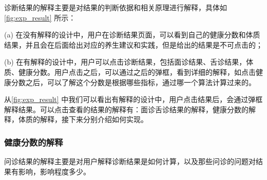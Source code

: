 诊断结果的解释主要是对结果的判断依据和相关原理进行解释，具体如 \ref{fig:exp_result} 所示：

(a) 在没有解释的设计中，用户在诊断结果页面，可以看到自己的健康分数和体质结果，并且会在后面给出对应的养生建议和实践，但是给出的结果是不可点击的；

(b) 在有解释的设计中，用户可以点击诊断结果，包括面诊结果、舌诊结果，体质、健康分数。用户点击之后，可以通过之后的弹框，看到详细的解释，如点击健康分数之后，可以了解这个分数是根据哪些指标，通过哪一个算法计算过来的。

从\ref{fig:exp_result} 中我们可以看出有解释的设计中，用户点击结果后，会通过弹框解释结果。可以点击查看的结果的解释有：面诊舌诊结果的解释，健康分数的解释，体质的解释，接下来分别介绍如何实现。



\subsubsection{健康分数的解释}
问诊结果的解释主要是对用户解释诊断结果是如何计算，以及那些问诊的问题对结果有影响，影响程度多少。

